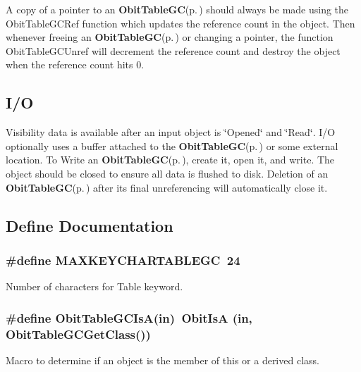 A copy of a pointer to an {\bf Obit\-Table\-GC}{\rm (p.\,\pageref{structObitTableGC})} should always be made using the Obit\-Table\-GCRef function which updates the reference count in the object. Then whenever freeing an {\bf Obit\-Table\-GC}{\rm (p.\,\pageref{structObitTableGC})} or changing a pointer, the function Obit\-Table\-GCUnref will decrement the reference count and destroy the object when the reference count hits 0.\subsection{I/O}\label{ObitTableGC_8h_ObitTableGCUsage}
Visibility data is available after an input object is \char`\"{}Opened\char`\"{} and \char`\"{}Read\char`\"{}. I/O optionally uses a buffer attached to the {\bf Obit\-Table\-GC}{\rm (p.\,\pageref{structObitTableGC})} or some external location. To Write an {\bf Obit\-Table\-GC}{\rm (p.\,\pageref{structObitTableGC})}, create it, open it, and write. The object should be closed to ensure all data is flushed to disk. Deletion of an {\bf Obit\-Table\-GC}{\rm (p.\,\pageref{structObitTableGC})} after its final unreferencing will automatically close it.

\subsection{Define Documentation}
\subsubsection{\setlength{\rightskip}{0pt plus 5cm}\#define MAXKEYCHARTABLEGC\ 24}\label{ObitTableGC_8h_a0}


Number of characters for Table keyword. 

\subsubsection{\setlength{\rightskip}{0pt plus 5cm}\#define Obit\-Table\-GCIs\-A(in)\ Obit\-Is\-A (in, Obit\-Table\-GCGet\-Class())}\label{ObitTableGC_8h_a3}


Macro to determine if an object is the member of this or a derived class. 

